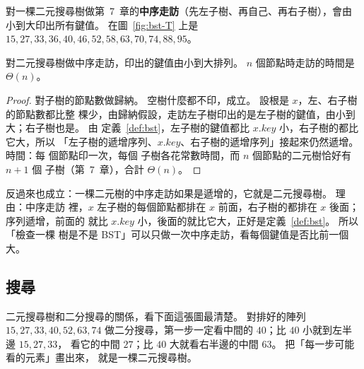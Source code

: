 對一棵二元搜尋樹做第~7~章的\textbf{中序走訪}（先左子樹、再自己、再右子樹），會由
小到大印出所有鍵值。 在圖~\ref{fig:bst-T} 上是 $15,\allowbreak 27,\allowbreak 33,\allowbreak 36,\allowbreak 40,\allowbreak 46,\allowbreak 52,\allowbreak 58,\allowbreak 63,\allowbreak 70,\allowbreak 74,\allowbreak 88,\allowbreak 95$。

\begin{theorem}
\label{thm:bst-inorder}
對二元搜尋樹做中序走訪，印出的鍵值由小到大排列。 $n$ 個節點時走訪的時間是
$\Theta(n)$。
\end{theorem}

\begin{proof}
對子樹的節點數做歸納。 空樹什麼都不印，成立。 設根是 $x$，左、右子樹的節點數都比整
棵少，由歸納假設，走訪左子樹印出的是左子樹的鍵值，由小到大；右子樹也是。 由
定義~\ref{def:bst}，左子樹的鍵值都比 $x.\mathit{key}$ 小，右子樹的都比它大，所以
「左子樹的遞增序列、$x.\mathit{key}$、右子樹的遞增序列」接起來仍然遞增。 時間：每
個節點印一次，每個 \NIL 子樹各花常數時間，而 $n$ 個節點的二元樹恰好有 $n + 1$ 個
\NIL 子樹（第~7~章），合計 $\Theta(n)$。
\end{proof}

反過來也成立：一棵二元樹的中序走訪如果是遞增的，它就是二元搜尋樹。 理由：中序走訪
裡，$x$ 左子樹的每個節點都排在 $x$ 前面，右子樹的都排在 $x$ 後面；序列遞增，前面的
就比 $x.\mathit{key}$ 小，後面的就比它大，正好是定義~\ref{def:bst}。 所以「檢查一棵
樹是不是 BST」可以只做一次中序走訪，看每個鍵值是否比前一個大。

\subsection{搜尋}

二元搜尋樹和二分搜尋的關係，看下面這張圖最清楚。 對排好的陣列 $15,\allowbreak 27,\allowbreak 33,\allowbreak 40,\allowbreak 52,\allowbreak 63,\allowbreak 74$ 做二分搜尋，第一步一定看中間的 $40$；比 $40$ 小就到左半邊 $15, 27, 33$，
看它的中間 $27$；比 $40$ 大就看右半邊的中間 $63$。 把「每一步可能看的元素」畫出來，
就是一棵二元搜尋樹。

\begin{center}
\label{fig:bst-binsearch}
\end{center}

